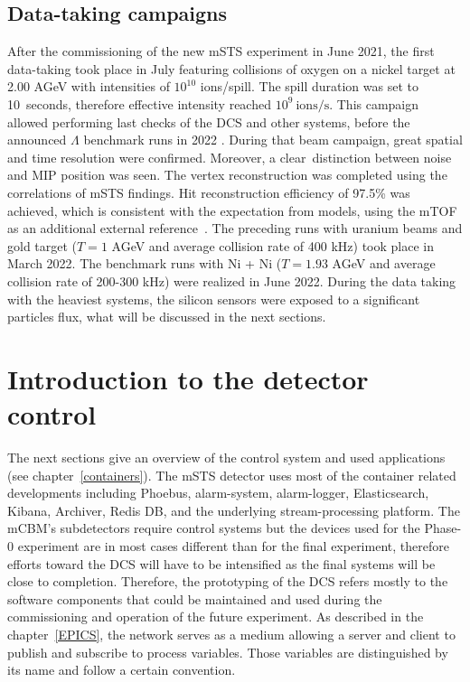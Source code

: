 \subsection{Data-taking campaigns}
After the commissioning of the new \gls{mSTS} experiment in June 2021, the first data-taking took place in July featuring collisions of oxygen on a nickel target at 2.00 AGeV with intensities of $10^{10}$ ions/spill. The spill duration was set to \SI{10}{seconds}, therefore effective intensity reached $10^{9}~\mathrm{ions/s}$. This campaign allowed performing last checks of the DCS and other systems, before the announced $\Lambda$ benchmark runs in 2022 \cite{sturm3}. During that beam campaign, great spatial and time resolution were confirmed. Moreover, a clear distinction between noise and MIP position was seen. The vertex reconstruction was completed using the correlations of \gls{mSTS} findings. Hit reconstruction efficiency of 97.5\% was achieved, which is consistent with the expectation from models, using the mTOF as an additional external reference~\cite{dario1}. The preceding runs with uranium beams and gold target ($T = 1$ AGeV and average collision rate of 400 kHz) took place in March 2022. The benchmark runs with Ni + Ni ($T = 1.93$ AGeV and average collision rate of 200-300 kHz) were realized in June 2022. During the data taking with the heaviest systems, the silicon sensors were exposed to a significant particles flux, what will be discussed in the next sections. 
\section{Introduction to the detector control}
The next sections give an overview of the control system and used applications (see chapter~\ref{containers}). The \gls{mSTS} detector uses most of the container related developments including Phoebus, alarm-system, alarm-logger, Elasticsearch, Kibana, Archiver, Redis \gls{DB}, and the underlying stream-processing platform. The mCBM's subdetectors require control systems but the devices used for the Phase-0 experiment are in most cases different than for the final experiment, therefore efforts toward the DCS will have to be intensified as the final systems will be close to completion. Therefore, the prototyping of the DCS refers mostly to the software components that could be maintained and used during the commissioning and operation of the future experiment. As described in the chapter~\ref{EPICS}, the network serves as a medium allowing a server and client to publish and subscribe to process variables. Those variables are distinguished by its name and follow a certain convention.
